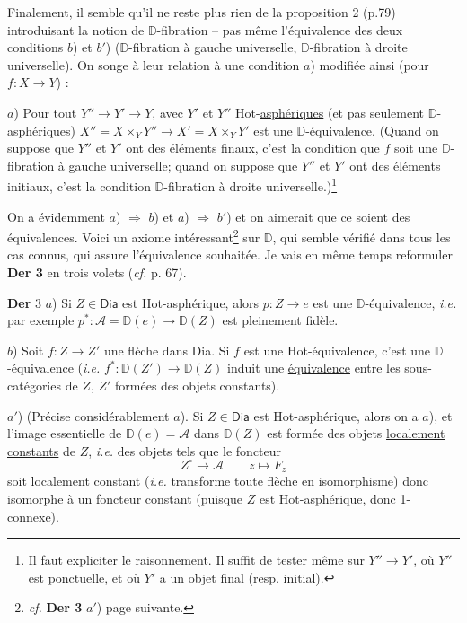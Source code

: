 \documentclass[11pt]{article}
\newcommand{\printedpage}[1]{\marginpar{\footnotesize p.~#1}}
\newcommand{\msp}[1]{\marginpar{\footnotesize [#1]}}
\newcommand{\Hot}{\textsf{Hot}}
\newcommand{\Dia}{\textsf{Dia}}
\newcommand{\DD}{\mathbb{D}}
\begin{document}
\printedpage{59}

\msp{page 96}
Finalement, il semble qu’il ne reste plus rien de la proposition 2 (p.79) introduisant la notion de $\DD$-fibration – pas même l’équivalence des deux conditions $b$) et $b'$) ($\DD$-fibration à gauche universelle, $\DD$-fibration à droite universelle). On songe à leur relation à une condition $a$) modifiée ainsi (pour $f : X \to Y$) :

$a$) Pour tout $Y'' \to Y' \to Y$, avec $Y'$ et $Y''$ \Hot-\underline{asphériques} (et pas seulement $\DD$-asphériques) $X'' = X \times_Y Y'' \to X' = X \times_Y Y'$ est une $\DD$-équivalence. (Quand on suppose que $Y''$ et $Y'$ ont des éléments finaux, c’est la condition que $f$ soit une $\DD$-fibration à gauche universelle; quand on suppose que $Y''$ et $Y'$ ont des éléments initiaux, c’est la condition $\DD$-fibration à droite universelle.)\footnote[48]{Il faut expliciter le raisonnement. Il suffit de tester même sur $Y'' \to Y'$, où $Y''$ est \underline{ponctuelle}, et où $Y'$ a un objet final (resp. initial).}

On a évidemment $a$) $\Rightarrow$ $b$) et $a$) $\Rightarrow$ $b'$) et on aimerait que ce soient des équivalences. Voici un axiome intéressant\footnote[49]{\textit{cf.} \textbf{Der 3} $a'$) page suivante.} sur $\DD$, qui semble vérifié dans tous les cas connus, qui assure l’équivalence souhaitée. Je vais en même temps reformuler \textbf{Der 3} en trois volets (\textit{cf.} p. 67).

\msp{page 97}
\textbf{Der} 3 $a$) Si $Z \in \Dia$ est \Hot-asphérique, alors $p : Z \to e$ est une $\DD$-équivalence, \textit{i.e.} par exemple $p^* : \mathcal{A} = \DD(e) \to \DD(Z)$ est pleinement fidèle.

$b$) Soit $f : Z \to Z'$ une flèche dans \Dia. Si $f$ est une \Hot-équivalence, c’est une $\DD$-équivalence (\textit{i.e.} $f^* : \DD(Z') \to \DD(Z)$ induit une \underline{équivalence} entre les sous-catégories de $Z$, $Z'$ formées des objets constants).

$a'$) (Précise considérablement $a$). Si $Z \in \Dia$ est \Hot-asphérique, alors on a $a$), et l’image essentielle de $\DD(e) = \mathcal{A}$ dans $\DD(Z)$ est formée des objets \underline{localement} \underline{constants} de $Z$, \textit{i.e.} des objets tels que le foncteur
\[
Z^{\circ} \longrightarrow \mathcal{A} \qquad z \longmapsto F_z
\]
soit localement constant (\textit{i.e.} transforme toute flèche en isomorphisme) donc isomorphe à un foncteur constant (puisque $Z$ est \Hot-asphérique, donc 1-connexe).
\end{document}
